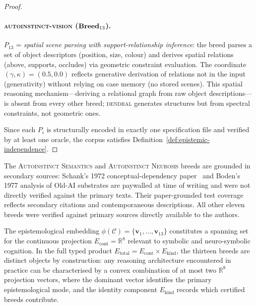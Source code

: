 \begin{proof}
\paragraph{\textsc{autoinstinct-vision} ($\mathbf{Breed}_{13}$).}
$P_{13}$ = \emph{spatial scene parsing with support-relationship inference}: the breed
parses a set of object descriptors (position, size, colour) and derives spatial relations
(above, supports, occludes) via geometric constraint evaluation. The coordinate
$(\gamma, \kappa) = (0.5, 0.0)$ reflects generative derivation of relations not in the
input (generativity) without relying on case memory (no stored scenes). This spatial
reasoning mechanism---deriving a relational graph from raw object descriptions---is absent
from every other breed; \textsc{dendral} generates structures but from spectral
constraints, not geometric ones.

Since each $P_i$ is structurally encoded in exactly one specification file and verified
by at least one oracle, the corpus satisfies Definition~\ref{def:epistemic-independence}.
\end{proof}

\begin{remark}
\label{rem:secondary-source}
The \textsc{Autoinstinct Semantics} and \textsc{Autoinstinct Neurosis} breeds are grounded
in secondary sources: Schank's 1972 conceptual-dependency paper~\cite{schank1972} and
Boden's 1977 analysis of Old-AI substrates are paywalled at time of writing and were not
directly verified against the primary texts. Their paper-grounded test coverage reflects
secondary citations and contemporaneous descriptions. All other eleven breeds were verified
against primary sources directly available to the authors.
\end{remark}

\begin{corollary}
\label{cor:corpus-basis}
The epistemological embedding $\phi(\mathcal{C}) = \{\mathbf{v}_1, \ldots, \mathbf{v}_{13}\}$
constitutes a spanning set for the continuous projection $E_{\text{cont}} = \mathbb{R}^8$
relevant to symbolic and neuro-symbolic cognition. In the full typed product
$E_{\text{total}} = E_{\text{cont}} \times E_{\text{kind}}$, the thirteen breeds are
distinct objects by construction: any reasoning architecture encountered in practice can
be characterised by a convex combination of at most two $\mathbb{R}^8$ projection vectors,
where the dominant vector identifies the primary epistemological mode, and the identity
component $E_{\text{kind}}$ records which certified breeds contribute.
\end{corollary}


